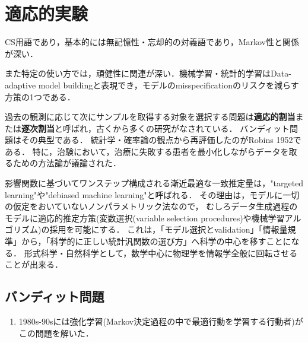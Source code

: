 \documentclass[uplatex,dvipdfmx]{jsreport}
\begin{document}
\section{適応的実験}

\begin{tcolorbox}[colframe=ForestGreen, colback=ForestGreen!10!white,breakable,colbacktitle=ForestGreen!40!white,coltitle=black,fonttitle=\bfseries\sffamily,
title=]
    CS用語であり，基本的には無記憶性・忘却的の対義語であり，Markov性と関係が深い．

    また特定の使い方では，頑健性に関連が深い．機械学習・統計的学習はData-adaptive model buildingと表現でき，モデルのmisspecificationのリスクを減らす方策の1つである．
\end{tcolorbox}

\begin{history}
    過去の観測に応じて次にサンプルを取得する対象を選択する問題は\textbf{適応的割当}または\textbf{逐次割当}と呼ばれ，古くから多くの研究がなされている．
    バンディット問題はその典型である．
    統計学・確率論の観点から再評価したのがRobins 1952である．
    特に，治験において，治療に失敗する患者を最小化しながらデータを取るための方法論が議論された．
\end{history}

\begin{discussion}[この研究がコーナーストーンである理由]
    影響関数に基づいてワンステップ構成される漸近最適な一致推定量は，"targeted learning"や"debiased machine learning"と呼ばれる．
    その理由は，モデルに一切の仮定をおいていないノンパラメトリック法なので，
    むしろデータ生成過程のモデルに適応的推定方策(変数選択(variable selection procedures)や機械学習アルゴリズム)の採用を可能にする．
    これは，「モデル選択とvalidation」「情報量規準」から，「科学的に正しい統計汎関数の選び方」へ科学の中心を移すことになる．
    形式科学・自然科学として，数学中心に物理学を情報学全般に回転させることが出来る．\cite{Hines}
\end{discussion}

\subsection{バンディット問題}

\begin{history}
    \begin{enumerate}
        \item 1980s-90sには強化学習(Markov決定過程の中で最適行動を学習する行動者)がこの問題を解いた．
    \end{enumerate}
\end{history}
\end{document}

